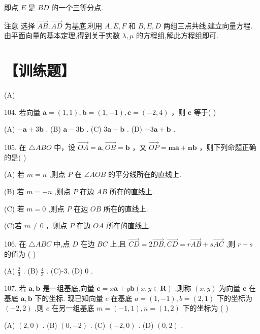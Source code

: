 \documentclass[10pt]{article}
\begin{document}
即点 \(E\) 是 \({BD}\) 的一个三等分点.

注意 选择 \(\overrightarrow{AB},\overrightarrow{AD}\) 为基底,利用 \(A,E,F\) 和 \(B,E,D\) 两组三点共线,建立向量方程. 由平面向量的基本定理,得到关于实数 \(\lambda ,\mu\) 的方程组,解此方程组即可.

\section*{【训练题】}

(A)

104. 若向量 \(\mathbf{a} = \left( {1,1}\right) ,\mathbf{b} = \left( {1, - 1}\right) ,\mathbf{c} = \left( {-2,4}\right)\) ，则 \(\mathbf{c}\) 等于( )

(A) \(- \mathbf{a} + 3\mathbf{b}\) . (B) \(\mathbf{a} - 3\mathbf{b}\) . (C) \(3\mathbf{a} - \mathbf{b}\) . (D) \(- 3\mathbf{a} + \mathbf{b}\) .

105. 在 \(\bigtriangleup  {ABO}\) 中，设 \(\overrightarrow{OA} = \mathbf{a},\overrightarrow{OB} = \mathbf{b}\) ，又 \(\overrightarrow{OP} = \mathbf{m}\mathbf{a} + \mathbf{n}\mathbf{b}\) ，则下列命题正确的是( )

(A) 若 \(m = n\) ,则点 \(P\) 在 \(\angle {AOB}\) 的平分线所在的直线上.

(B) 若 \(m =  - n\) ,则点 \(P\) 在边 \({AB}\) 所在的直线上.

(C) 若 \(m = 0\) ,则点 \(P\) 在边 \({OB}\) 所在的直线上.

(C)若 \(m \neq  0\) ，则点 \(P\) 在边 \({OA}\) 所在的直线上.

106. 在 \(\bigtriangleup {ABC}\) 中,点 \(D\) 在边 \({BC}\) 上,且 \(\overrightarrow{CD} = 2\overrightarrow{DB},\overrightarrow{CD} = r\overrightarrow{AB} + s\overrightarrow{AC}\) ,则 \(r + s\) 的值为 ( )

(A) \(\frac{2}{3}\) . (B) \(\frac{4}{3}\) . (C)-3. (D) 0 .

107. 若 \(\mathbf{a},\mathbf{b}\) 是一组基底,向量 \(\mathbf{c} = x\mathbf{a} + y\mathbf{b}\left( {x,y \in  \mathbf{R}}\right)\) ,则称 \(\left( {x,y}\right)\) 为向量 \(\mathbf{c}\) 在基底 \(\mathbf{a},\mathbf{b}\) 下的坐标. 现已知向量 \(c\) 在基底 \(a = \left( {1, - 1}\right) ,b = \left( {2,1}\right)\) 下的坐标为 \(\left( {-2,2}\right)\) ,则 \(c\) 在另一组基底 \(m = \left( {-1,1}\right) ,n = \left( {1,2}\right)\) 下的坐标为 ( )

(A) \(\left( {2,0}\right)\) . (B) \(\left( {0, - 2}\right)\) . (C) \(\left( {-2,0}\right)\) . (D) \(\left( {0,2}\right)\) .
\end{document}
